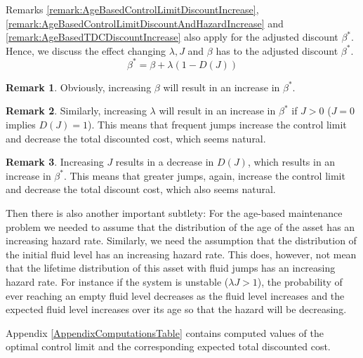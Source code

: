 \documentclass[a4paper]{thesis}
\theoremstyle{definition}
\newtheorem{remark}{Remark}[chapter]
\begin{document}
Remarks \ref{remark:AgeBasedControlLimitDiscountIncrease}, \ref{remark:AgeBasedControlLimitDiscountAndHazardIncrease} and \ref{remark:AgeBasedTDCDiscountIncrease} also apply for the adjusted discount $\beta^*$.
Hence, we discuss the effect changing $\lambda,J$ and $\beta$ has to the adjusted discount $\beta^*$.
\[
\beta^*=\beta+\lambda(1-D(J))
\]
\begin{remark}
	Obviously, increasing $\beta$ will result in an increase in $\beta^*$.
\end{remark}
\begin{remark}
Similarly, increasing $\lambda$ will result in an increase in $\beta^*$ if $J>0$ ($J=0$ implies $D(J)=1$).
This means that frequent jumps increase the control limit and decrease the total discounted cost, which seems natural.
\end{remark}
\begin{remark}
	Increasing $J$ results in a decrease in $D(J)$, which results in an increase in $\beta^*$.
	This means that greater jumps, again, increase the control limit and decrease the total discount cost, which also seems natural.
\end{remark}
Then there is also another important subtlety: For the age-based maintenance problem we needed to assume that the distribution of the age of the asset has an increasing hazard rate.
Similarly, we need the assumption that the distribution of the initial fluid level has an increasing hazard rate.
This does, however, not mean that the lifetime distribution of this asset with fluid jumps has an increasing hazard rate.
For instance if the system is unstable ($\lambda J>1$), the probability of ever reaching an empty fluid level decreases as the fluid level increases and the expected fluid level increases over its age so that the hazard will be decreasing.

Appendix \ref{AppendixComputationsTable} contains computed values of the optimal control limit and the corresponding expected total discounted cost. 
\end{document}
